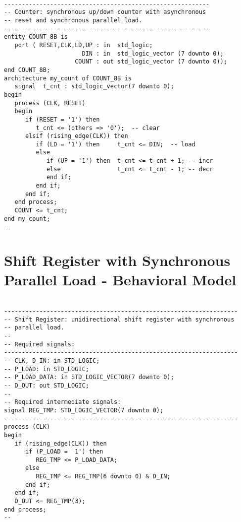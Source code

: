 \noindent
\begin{minipage}{0.99\linewidth}
\begin{lstlisting}

----------------------------------------------------------
-- Counter: synchronous up/down counter with asynchronous 
-- reset and synchronous parallel load. 
----------------------------------------------------------
entity COUNT_8B is
   port ( RESET,CLK,LD,UP : in  std_logic; 
                      DIN : in  std_logic_vector (7 downto 0); 
                    COUNT : out std_logic_vector (7 downto 0)); 
end COUNT_8B; 
architecture my_count of COUNT_8B is 
   signal  t_cnt : std_logic_vector(7 downto 0); 
begin          
   process (CLK, RESET) 
   begin
      if (RESET = '1') then    
         t_cnt <= (others => '0');  -- clear
      elsif (rising_edge(CLK)) then
         if (LD = '1') then     t_cnt <= DIN;  -- load
         else 
            if (UP = '1') then  t_cnt <= t_cnt + 1; -- incr
            else                t_cnt <= t_cnt - 1; -- decr
            end if;
         end if;
      end if;
   end process;
   COUNT <= t_cnt; 
end my_count;
--
\end{lstlisting}
\end{minipage}

\section{Shift Register with Synchronous Parallel Load - Behavioral Model}

\noindent
\begin{minipage}{0.99\linewidth}
\begin{lstlisting}

------------------------------------------------------------------
-- Shift Register: unidirectional shift register with synchronous 
-- parallel load. 
-- 
-- Required signals: 
------------------------------------------------------------------
-- CLK, D_IN: in STD_LOGIC;
-- P_LOAD: in STD_LOGIC;
-- P_LOAD_DATA: in STD_LOGIC_VECTOR(7 downto 0);
-- D_OUT: out STD_LOGIC; 
-- 
-- Required intermediate signals: 
signal REG_TMP: STD_LOGIC_VECTOR(7 downto 0);
------------------------------------------------------------------
process (CLK)
begin
   if (rising_edge(CLK)) then
      if (P_LOAD = '1') then
         REG_TMP <= P_LOAD_DATA;
      else
         REG_TMP <= REG_TMP(6 downto 0) & D_IN;
      end if;
   end if;
   D_OUT <= REG_TMP(3);
end process;
--
\end{lstlisting}
\end{minipage}

